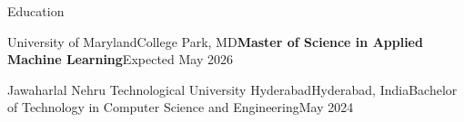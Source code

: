 \documentclass{resume} %
\begin{document}
\begin{rSection}{Education \vspace{.1em}}
\begin{rSubsection}{University of Maryland}{College Park, MD}{\textbf{Master of Science in Applied Machine Learning}}{Expected May 2026}
\end{rSubsection}

\begin{rSubsection}{Jawaharlal Nehru Technological University Hyderabad}{Hyderabad, India}{Bachelor of Technology in Computer Science and Engineering}{May 2024}
\end{rSubsection}
\end{rSection}

\end{document}
